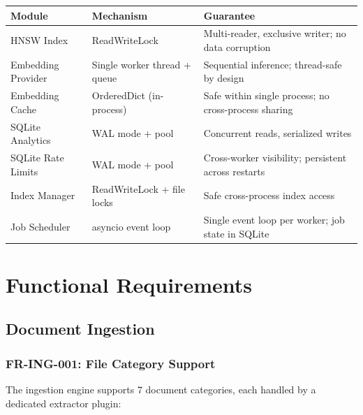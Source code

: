 \documentclass[11pt,a4paper]{article}
\begin{document}
\begin{longtable}{@{}p{4cm}p{3cm}p{6.5cm}@{}}
\toprule
\textbf{Module} & \textbf{Mechanism} & \textbf{Guarantee} \\
\midrule
\endhead
HNSW Index & ReadWriteLock & Multi-reader, exclusive writer; no data corruption \\
Embedding Provider & Single worker thread + queue & Sequential inference; thread-safe by design \\
Embedding Cache & OrderedDict (in-process) & Safe within single process; no cross-process sharing \\
SQLite Analytics & WAL mode + pool & Concurrent reads, serialized writes \\
SQLite Rate Limits & WAL mode + pool & Cross-worker visibility; persistent across restarts \\
Index Manager & ReadWriteLock + file locks & Safe cross-process index access \\
Job Scheduler & asyncio event loop & Single event loop per worker; job state in SQLite \\
\bottomrule
\end{longtable}

\section{Functional Requirements}

\subsection{Document Ingestion}

\subsubsection{FR-ING-001: File Category Support}

The ingestion engine supports 7 document categories, each handled by a dedicated extractor plugin:
\end{document}
